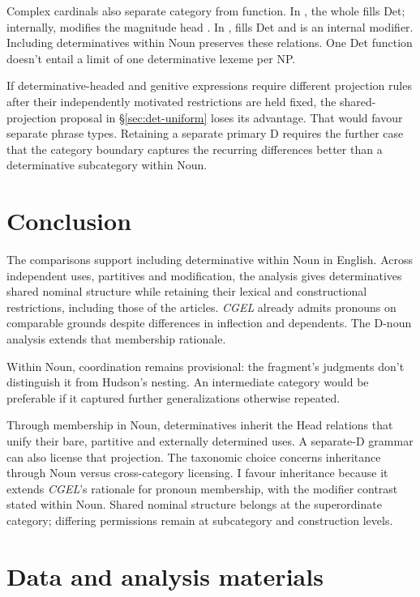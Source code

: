 \documentclass[12pt]{article}
\begin{document}
Complex cardinals also separate category from function. In , the whole  fills Det; internally,  modifies the magnitude head  \citep[§4]{reynolds2026numerals}. In ,  fills Det and  is an internal modifier. Including determinatives within Noun preserves these relations. One Det function doesn't entail a limit of one determinative lexeme per NP.

If determinative-headed and genitive expressions require different projection rules after their independently motivated restrictions are held fixed, the shared-projection proposal in §\ref{sec:det-uniform} loses its advantage. That would favour separate phrase types. Retaining a separate primary D requires the further case that the category boundary captures the recurring differences better than a determinative subcategory within Noun.

\section{Conclusion}\label{sec:conclusion}

The comparisons support including determinative within Noun in English. Across independent uses, partitives and modification, the analysis gives determinatives shared nominal structure while retaining their lexical and constructional restrictions, including those of the articles. \textit{CGEL} already admits pronouns on comparable grounds despite differences in inflection and dependents. The D-noun analysis extends that membership rationale.

Within Noun, coordination remains provisional: the fragment's judgments don't distinguish it from Hudson's nesting. An intermediate category would be preferable if it captured further generalizations otherwise repeated.

Through membership in Noun, determinatives inherit the Head relations that unify their bare, partitive and externally determined uses. A separate-D grammar can also license that projection. The taxonomic choice concerns inheritance through Noun versus cross-category licensing. I favour inheritance because it extends \textit{CGEL}'s rationale for pronoun membership, with the modifier contrast stated within Noun. Shared nominal structure belongs at the superordinate category; differing permissions remain at subcategory and construction levels.

\section*{Data and analysis materials}
\end{document}
